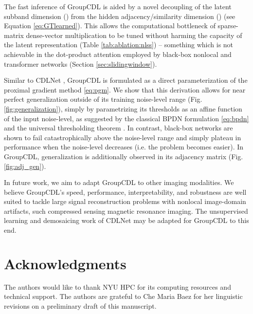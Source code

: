 \documentclass[lettersize,journal]{IEEEtran}
\begin{document}
The fast inference of GroupCDL is aided by a
novel decoupling of the latent subband dimension () from the hidden
adjacency/similarity dimension () (see Equation \eqref{eq:GTlearned}).
This allows the computational bottleneck of sparse-matrix dense-vector
multiplication to be tuned without harming the capacity of the latent
representation (Table \ref{tab:ablation:nlss}) -- something which is not
achievable in the dot-product attention employed by black-box nonlocal and
transformer networks (Section \ref{sec:slidingwindow}).

Similar to CDLNet \cite{janjusevicCDLNet2022}, GroupCDL is formulated as a direct
parameterization of the proximal gradient method \eqref{eq:pgm}. We show that this derivation allows for near
perfect generalization outside of its training noise-level range (Fig.
\ref{fig:generalization}), simply by parametrizing its thresholds as an affine
function of the input noise-level, as suggested by the classical BPDN
formulation \eqref{eq:bpdn} and the universal thresholding theorem
\cite{Mallat, janjusevicCDLNet2022}. In contrast, black-box networks \cite{DnCNN} 
are shown to fail catastrophically above the noise-level range and simply
plateau in performance when the noise-level decreases (i.e. the problem becomes
easier). In GroupCDL, generalization is additionally observed in its adjacency matrix (Fig. \ref{fig:adj_gen}).

In future work, we aim to adapt GroupCDL to other imaging modalities. We
believe GroupCDL's speed, performance, interpretability, and robustness are
well suited to tackle large signal reconstruction problems with nonlocal
image-domain artifacts, such compressed sensing magnetic resonance imaging. The
unsupervised learning and demosaicing work of CDLNet
\cite{janjusevicCDLNet2022} may be adapted for GroupCDL to this end. 

\section*{Acknowledgments}
The authors would like to thank NYU HPC for its computing resources and
technical support. The authors are grateful to Che Maria Baez for her
linguistic revisions on a preliminary draft of this manuscript.

\ifCLASSOPTIONcaptionsoff
  \newpage
\fi


\end{document}

